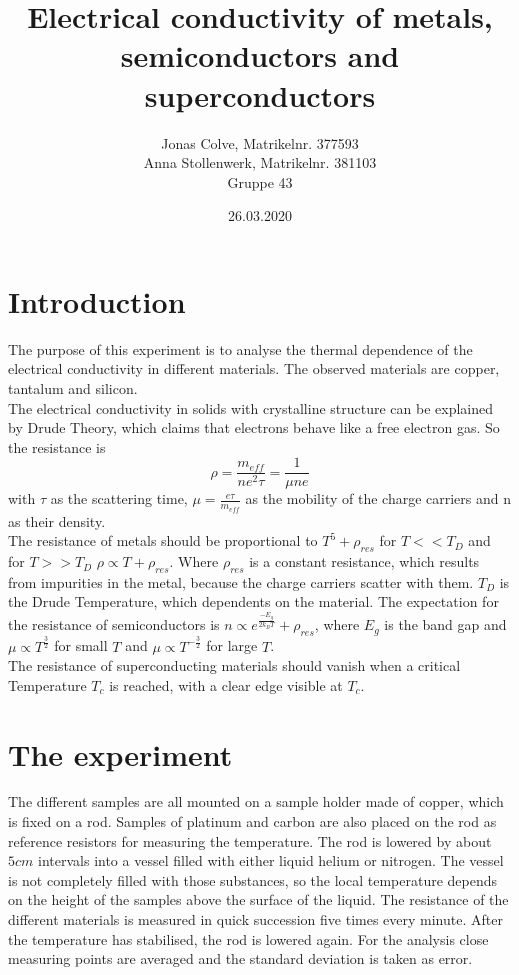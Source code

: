 \documentclass{article}
\title{\huge Electrical conductivity of metals, semiconductors and superconductors}
\author{\Large Jonas Colve, Matrikelnr. 377593\\ \Large Anna Stollenwerk, Matrikelnr. 381103 \\Gruppe 43}
\date{26.03.2020}
\begin{document}
\renewcommand{\figurename}{fig.}
\renewcommand{\tablename}{tab.}

\maketitle
\newpage



\tableofcontents

\newpage

\section{Introduction}
The purpose of this experiment is to analyse the thermal dependence of the electrical conductivity in different materials.
The observed materials are copper, tantalum and silicon.\\
The electrical conductivity in solids with crystalline structure can be explained by Drude Theory, which claims that electrons behave like a free electron gas.
So the resistance is
\begin{equation*}
    \rho = \frac{m_{eff}}{n e^2\tau} = \frac{1}{\mu n e}
\end{equation*}
with $\tau$ as the scattering time, $\mu = \frac{e \tau}{m_{eff}}$ as the mobility of the charge carriers and n as their density.\\
The resistance of metals should be proportional to $T^5 + \rho_{res}$ for $T<< T_{D}$ and for $T>> T_{D}$ $\rho \propto T+\rho_{res}$. Where $\rho_{res}$ is a constant resistance, which results from impurities in the metal, because the charge carriers scatter with them. $T_D$ is the Drude Temperature, which dependents on the material.
The expectation for the resistance of semiconductors is $n \propto e^{\frac{-E_g}{2 k_B T}} + \rho_{res}$, where $E_g$ is the band gap and $\mu \propto T^\frac{3}{2}$ for small $T$ and $\mu \propto T^{-\frac{3}{2}}$ for large $T$.\\
The resistance of superconducting materials should vanish when a critical Temperature $T_c$ is reached, with a clear edge visible at $T_c$.

\section{The experiment}
The different samples are all mounted on a sample holder made of copper, which is fixed on a rod.
Samples of platinum and carbon are also placed on the rod as reference resistors for measuring the temperature.
The rod is lowered by about $5cm$ intervals into a vessel filled with either liquid helium or nitrogen.
The vessel is not completely filled with those substances, so the local temperature depends on the height of the samples above the surface of the liquid.
The resistance of the different materials is measured in quick succession five times every minute. After the temperature has stabilised, the rod is lowered again.
For the analysis close measuring points are averaged and the standard deviation is taken as error.
\end{document}
